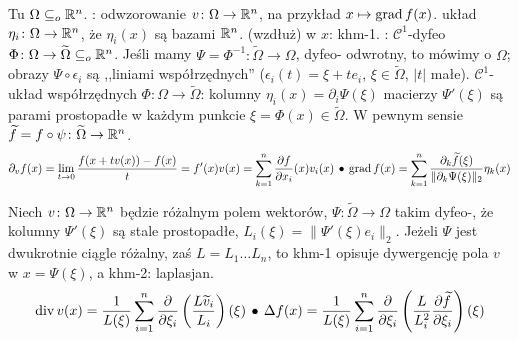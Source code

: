 Tu $\Omega \subseteq_o \mathbb{R}^n$.
:  odwzorowanie $v \colon \Omega \to \mathbb{R}^n$, na przykład  $x \mapsto \operatorname{grad} f(x)$.
 układ $\eta_i \colon \Omega \to \mathbb{R}^n$, że $\eta_i (x)$ są bazami $\mathbb{R}^n$.
 (wzdłuż) w $x$: khm-1.
: $\mathscr C^1$-dyfeo $\Phi \colon \Omega \to \widetilde{\Omega} \subseteq_o \mathbb{R}^n$.
Jeśli mamy $\Psi = \Phi^{-1} \colon \widetilde{\Omega} \to \Omega $, dyfeo- odwrotny, to mówimy o  $\Omega$; obrazy $\Psi \circ \epsilon_i$ są ,,liniami współrzędnych'' ($\epsilon_i(t) = \xi + te_i$, $\xi \in \widetilde \Omega$, $|t|$ małe).
 $\mathscr C^1$-układ współrzędnych $\Phi \colon \Omega \to \widetilde{\Omega}$: kolumny $\eta_i(x) = \partial_i \Psi(\xi)$ macierzy $\Psi'(\xi)$ są parami prostopadłe w każdym punkcie $\xi = \Phi(x) \in \widetilde{\Omega}$.
W pewnym sensie $\widetilde f = f \circ \psi \colon \widetilde \Omega \to \mathbb{R}^n$.
\[
	\partial_v f(x) = \lim_{t \to 0} \frac{f(x + tv(x)) - f(x)}{t} = f'(x)v(x) = \sum_{k=1}^n \frac{\partial f}{\partial x_i} (x) v_i(x) \, \bullet \,
	\operatorname{grad} f(x) = \sum_{k=1}^n \frac{\partial_k \widetilde{f}(\xi)}{\|\partial_k \Psi(\xi)\|_2} \eta_k(x)
\]


Niech  $v \colon \Omega \to \mathbb{R}^n$ będzie różalnym polem wektorów, $\Psi \colon \widetilde \Omega \to \Omega$ takim dyfeo-, że kolumny $\Psi'(\xi)$ są stale prostopadłe, $L_i(\xi) = \|\Psi'(\xi)e_i\|_2$.
Jeżeli $\Psi$ jest dwukrotnie ciągle różalny, zaś $L = L_1 \ldots L_n$, to khm-1 opisuje dywergencję pola $v$ w $x = \Psi(\xi)$, a khm-2: laplasjan.
\[
	\operatorname{div} v(x) = \frac{1}{L(\xi)} \sum_{i=1}^n \frac{\partial}{\partial \xi_i} \left(\frac{L \widetilde{v}_i}{L_i} \right) (\xi) \, \bullet \,
	\Delta f(x) = \frac{1}{L(\xi)} \sum_{i = 1}^n \frac{\partial}{\partial \xi_i} \left(\frac{L}{L_i^2} \frac{\partial \widetilde f}{\partial \xi_i}\right) (\xi)
\]



